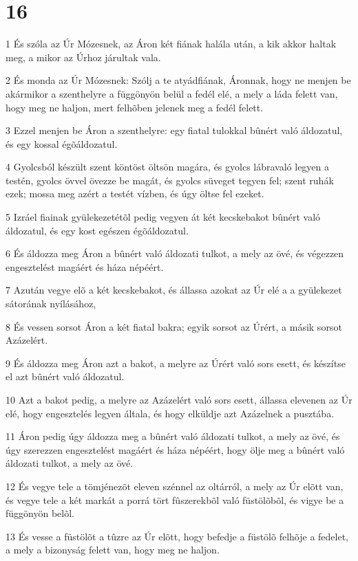 \chapter{16}

\par 1 És szóla az Úr Mózesnek, az Áron két fiának halála után, a kik akkor haltak meg, a mikor az Úrhoz járultak vala.
\par 2 És monda az Úr Mózesnek: Szólj a te atyádfiának, Áronnak, hogy ne menjen be akármikor a szenthelyre a függönyön belül a fedél elé, a mely a láda felett van, hogy meg ne haljon, mert felhõben jelenek meg a fedél felett.
\par 3 Ezzel menjen be Áron a szenthelyre: egy fiatal tulokkal bûnért való áldozatul, és egy kossal égõáldozatul.
\par 4 Gyolcsból készült szent köntöst öltsön magára, és gyolcs lábravaló legyen a testén, gyolcs övvel övezze be magát, és gyolcs süveget tegyen fel; szent ruhák ezek; mossa meg azért a testét vízben, és úgy öltse fel ezeket.
\par 5 Izráel fiainak gyülekezetétõl pedig vegyen át két kecskebakot bûnért való áldozatul, és egy kost egészen égõáldozatul.
\par 6 És áldozza meg Áron a bûnért való áldozati tulkot, a mely az övé, és végezzen engesztelést magáért és háza népéért.
\par 7 Azután vegye elõ a két kecskebakot, és állassa azokat az Úr elé a a gyülekezet sátorának nyílásához,
\par 8 És vessen sorsot Áron a két fiatal bakra; egyik sorsot az Úrért, a másik sorsot Azázelért.
\par 9 És áldozza meg Áron azt a bakot, a melyre az Úrért való sors esett, és készítse el azt bûnért való áldozatul.
\par 10 Azt a bakot pedig, a melyre az Azázelért való sors esett, állassa elevenen az Úr elé, hogy engesztelés legyen általa, és hogy elküldje azt Azázelnek a pusztába.
\par 11 Áron pedig úgy áldozza meg a bûnért való áldozati tulkot, a mely az övé, és úgy szerezzen engesztelést magáért és háza népéért, hogy ölje meg a bûnért való áldozati tulkot, a mely az övé.
\par 12 És vegye tele a tömjénezõt eleven szénnel az oltárról, a mely az Úr elõtt van, és vegye tele a két markát a porrá tört fûszerekbõl való füstölõbõl, és vigye be a függönyön belõl.
\par 13 És vesse a füstölõt a tûzre az Úr elõtt, hogy befedje a füstölõ felhõje a fedelet, a mely a bizonyság felett van, hogy meg ne haljon.
